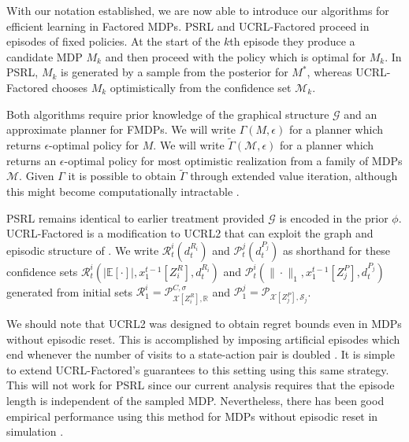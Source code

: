 \documentclass{article}
\newcommand{\Exp}{\mathds{E}}
\newcommand{\Real}{\mathds{R}}
\newcommand{\Xc}{\mathcal{X}}
\newcommand{\Pc}{\mathcal{P}}
\newcommand{\Gc}{\mathcal{G}}
\newcommand{\Rc}{\mathcal{R}}
\newcommand{\Sc}{\mathcal{S}}
\newcommand{\Mc}{\mathcal{M}}
\begin{document}
With our notation established, we are now able to introduce our algorithms for efficient learning in Factored MDPs.
PSRL and UCRL-Factored proceed in episodes of fixed policies.
At the start of the $k$th episode they produce a candidate MDP $M_k$ and then proceed with the policy which is optimal for $M_k$.
In PSRL, $M_k$ is generated by a sample from the posterior for $M^*$, whereas UCRL-Factored chooses $M_k$ optimistically from the confidence set $\Mc_k$.

Both algorithms require prior knowledge of the graphical structure $\Gc$ and an approximate planner for FMDPs.
We will write $\Gamma(M,\epsilon)$ for a planner which returns $\epsilon$-optimal policy for $M$.
We will write $\tilde{\Gamma}(\Mc,\epsilon)$ for a planner which returns an $\epsilon$-optimal policy for most optimistic realization from a family of MDPs $\Mc$.
Given $\Gamma$ it is possible to obtain $\tilde{\Gamma}$ through extended value iteration, although this might become computationally intractable \cite{jaksch2010near}.

PSRL remains identical to earlier treatment \cite{strens2000bayesian, osband2013more} provided $\Gc$ is encoded in the prior $\phi$.
UCRL-Factored is a modification to UCRL2 that can exploit the graph and episodic structure of .
We write $\Rc^i_t(d_t^{R_i})$ and $\Pc^j_t(d_t^{P_j})$ as shorthand for these confidence sets
$\Rc^i_t( | \Exp[\cdot] |, x^{t-1}_1[Z^R_i],d_t^{R_i})$ and $\Pc^i_t( \| \cdot \|_1, x^{t-1}_1[Z^P_j],d_t^{P_j})$
generated from initial sets $\Rc^i_1 = \Pc^{C,\sigma}_{\Xc[Z^R_i],\Real}$ and $\Pc^j_1 = \Pc_{\Xc[Z^P_j],\Sc_j}$.

We should note that UCRL2 was designed to obtain regret bounds even in MDPs without episodic reset.
This is accomplished by imposing artificial episodes which end whenever the number of visits to a state-action pair is doubled \cite{jaksch2010near}.
It is simple to extend UCRL-Factored's guarantees to this setting using this same strategy.
This will not work for PSRL since our current analysis requires that the episode length is independent of the sampled MDP.
Nevertheless, there has been good empirical performance using this method for MDPs without episodic reset in simulation \cite{osband2013more}.


\end{document}
